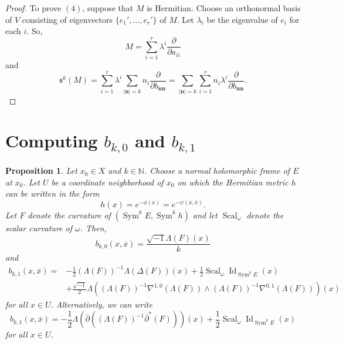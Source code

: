 \documentclass{amsart}
\newtheorem{prop}[thm]{Proposition}
\theoremstyle{definition}
\theoremstyle{remark}
\numberwithin{equation}{section}
\newcommand{\tanv}[1]{\frac{\partial}{\partial #1}}
\DeclareMathOperator{\Sym}{Sym}
\DeclareMathOperator{\Id}{Id}
\DeclareMathOperator{\Scal}{Scal}
\begin{document}
\begin{proof}
To prove $(4)$, suppose that $M$ is Hermitian. Choose an orthonormal basis of $V$ consisting of eigenvectors $\{e_1', \dotsc, e_r'\}$ of $M$. Let $\lambda_i$ be the eigenvalue of $e_i$ for each $i$. So,
$$
M = \sum_{i=1}^r \lambda^i \tanv{a_{ii}}
$$
and
$$
\mathfrak{s}^k (M) = \sum_{i=1}^r \lambda^i \sum_{|\mathbf{n}| = k} n_i \tanv{b_{\mathbf{n}\mathbf{n}}} = \sum_{|\mathbf{n}| = k} \sum_{i=1}^r n_i\lambda^i \tanv{b_{\mathbf{n}\mathbf{n}}}.
$$

\end{proof}



\newpage



\section{Computing $b_{k,0}$ and $b_{k,1}$} 

\begin{prop} \label{prop: computation}
Let $x_0 \in X$ and $k \in \mathbb{N}$. Choose a normal holomorphic frame of $E$ at $x_0$. Let $U$ be a coordinate neighborhood of $x_0$ on which the Hermitian metric $h$ can be written in the form 
$$
h(x) = e^{-\phi(x)} = e^{-\psi(x,\overline{x})}.
$$ 
Let $F$ denote the curvature of $(\Sym^k E, \Sym^k h)$ and let $\Scal_\omega$ denote the scalar curvature of $\omega$. Then,
$$
b_{k,0}(x,\overline{x}) = \frac{  \sqrt{-1}\Lambda (F)(x) }{k}
$$
and
\begin{equation*}
\begin{split}
b_{k,1}(x,\overline{x})  = &  -\frac{1}{2}(\Lambda (F) )^{-1}\Lambda (\Delta (F)) (x) 
+ \frac{1}{2}\Scal_\omega \Id_{\Sym^k E} (x)  \\
    & +  \frac{\sqrt{-1}}{2} \Lambda  \left ( (\Lambda(F))^{-1} \nabla^{1,0}(\Lambda(F)) \wedge (\Lambda(F))^{-1} \nabla^{0,1}(\Lambda (F))   \right ) (x)
\end{split}
\end{equation*}
for all $x \in U$. Alternatively, we can write
\begin{equation*}
    b_{k,1}(x,\overline{x})  =    -\frac{1}{2} \Lambda \left (  \overline{\partial} \left ( (\Lambda (F) )^{-1} \overline{\partial}^* (F) \right ) \right ) (x) 
+ \frac{1}{2}\Scal_\omega \Id_{\Sym^k E} (x)
\end{equation*}
for all $x \in U$.
\end{prop}
\end{document}
